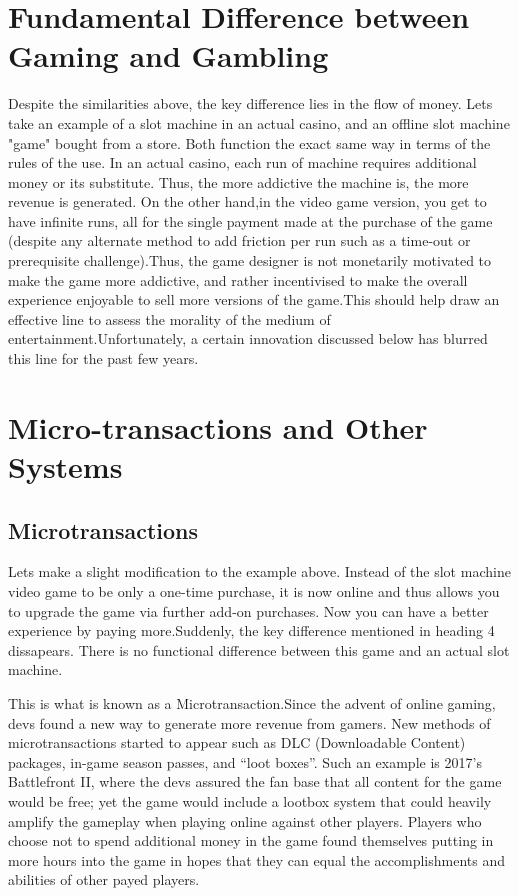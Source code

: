 \documentclass{article}
\begin{document}
\section{Fundamental Difference between Gaming and Gambling}
Despite the similarities above, the key difference lies in the flow of money. Lets take an example of a slot machine in an actual casino, and an offline slot machine "game" bought from a store. Both function the exact same way in terms of the rules of the use. In an actual casino, each run of machine requires additional money or its substitute. Thus, the more addictive the machine is, the more revenue is generated. On the other hand,in the video game version, you get to have infinite runs, all for the single payment made at the purchase of the game (despite any alternate method to add friction per run such as a time-out or prerequisite challenge).Thus, the game designer is not monetarily motivated to make the game more addictive, and rather incentivised to make the overall experience enjoyable to sell more versions of the game.This should help draw an effective line to assess the morality of the medium of entertainment.Unfortunately, a certain innovation discussed below has blurred this line for the past few years.\cite{gainsbury2015exploratory} 

\section{Micro-transactions and Other Systems}

\subsection{Microtransactions}
Lets make a slight modification to the example above. Instead of the slot machine video game to be only a one-time purchase, it is now online and thus allows you to upgrade the game via further add-on purchases. Now you can have a better experience by paying more.Suddenly, the key difference mentioned in heading 4 dissapears. There is no functional difference between this game and an actual slot machine.

This is what is known as a Microtransaction.Since the advent of online gaming, devs found a new way to generate more revenue from gamers. New methods of microtransactions started to appear such as DLC (Downloadable Content) packages, in-game season passes, and “loot boxes”. Such an example is 2017's Battlefront II, where the devs assured the fan base that all content for the game would be free; yet the game would include a lootbox system that could heavily amplify the gameplay when playing online against other players. Players who choose not to spend additional money in the game found themselves putting in more hours into the game in hopes that they can equal the accomplishments and abilities of other payed players.\cite{king2015distinguishing}
\end{document}
